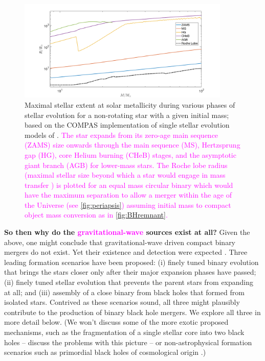 \documentclass[iop,onecolumn]{revtex4}
\newcommand{\todo}[1]{\textcolor{red}{#1}}
\newcommand{\ilya}[1]{\textcolor{magenta}{#1}}
\begin{document}
\begin{figure}
	\centering	
	\includegraphics[width=0.9\textwidth]{StellarRadiusZsolarRoche.png}
\caption{Maximal stellar extent at solar metallicity during various phases of stellar evolution for a non-rotating star with a given initial mass; based on the COMPAS implementation of single stellar evolution models of \citet{Hurley:2000}.   \ilya{The star expands from its zero-age main sequence (ZAMS) size onwards through the main sequence (MS), Hertzsprung gap (HG), core Helium burning (CHeB) stages, and the asymptotic giant branch (AGB) for lower-mass stars.  The Roche lobe radius (maximal stellar size beyond which a star would engage in mass transfer \citep{Eggleton:1983}) is plotted for an equal mass circular binary which would have the maximum separation to allow a merger within the age of the Universe (see \autoref{fig:periapsis}) assuming initial mass to compact object mass conversion as in \autoref{fig:BHremnant}.}\label{fig:Rmax} }
\end{figure}


\textbf{So then why do the \ilya{gravitational-wave} sources exist at all?} Given the above, one might conclude that gravitational-wave driven compact binary mergers do not exist. Yet their existence and detection were expected \ilya{\citep{ratesdoc}}. Three leading formation scenarios have been proposed: (i) finely tuned binary evolution that brings the stars closer only after their major expansion phases have passed; (ii) finely tuned stellar evolution that prevents the parent stars from expanding at all; and (iii) assembly of a close binary from black holes that formed from isolated stars. Contrived as these scenarios sound, all three might plausibly contribute to the production of binary black hole mergers. We explore all three in more detail below. (We won't discuss some of the more exotic proposed mechanisms, such as the fragmentation of a single stellar core into two black holes \citep{Loeb:2016} -- \citet{Woosley:2016,Dai:2017} discuss the problems with this picture -- or non-astrophysical formation scenarios such as primordial black holes of cosmological origin \citep[e.g.,][]{Bird:2016}.)
\end{document}
